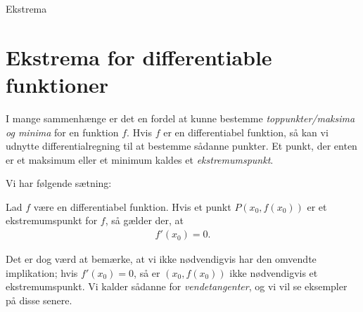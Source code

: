 \begin{center}
\Huge
Ekstrema
\end{center}

\section*{Ekstrema for differentiable funktioner}

I mange sammenhænge er det en fordel at kunne bestemme \textit{toppunkter/maksima og minima} for en funktion $f$. Hvis $f$ er en differentiabel funktion, så kan vi udnytte differentialregning til at bestemme sådanne punkter. Et punkt, der enten er et maksimum eller et minimum kaldes et \textit{ekstremumspunkt}. 

Vi har følgende sætning:
\begin{setn}[Ekstremumspunkter]
	Lad $f$ være en differentiabel funktion. Hvis et punkt $P(x_0,f(x_0))$ er et ekstremumspunkt for $f$, så gælder der, at 
	\begin{align*}
		f'(x_0) = 0.
	\end{align*}
\end{setn}
Det er dog værd at bemærke, at vi ikke nødvendigvis har den omvendte implikation; hvis $f'(x_0)=0$, så er $(x_0,f(x_0))$ ikke nødvendigvis et ekstremumspunkt. Vi kalder sådanne for \textit{vendetangenter}, og vi vil se eksempler på disse senere. 

